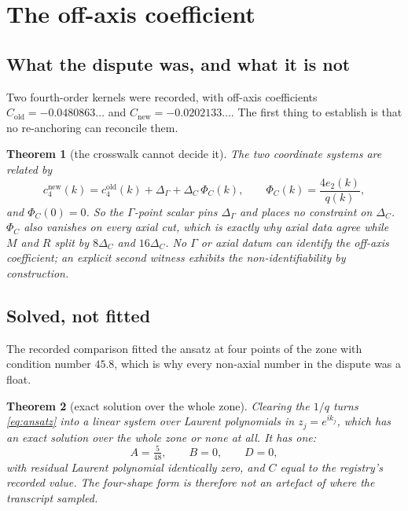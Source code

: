 \documentclass[11pt]{article}
\newtheorem{theorem}{Theorem}[section]
\theoremstyle{definition}
\theoremstyle{remark}
\newcommand{\chk}[1]{}
\begin{document}
\section{The off-axis coefficient}\label{sec:c2}

\subsection{What the dispute was, and what it is not}

Two fourth-order kernels were recorded, with off-axis coefficients
$C_{\mathrm{old}}=-0.0480863\ldots$ and $C_{\mathrm{new}}=-0.0202133\ldots$.
The first thing to establish is that no re-anchoring can reconcile them.

\begin{theorem}[the crosswalk cannot decide it]\label{thm:obstruction}
The two coordinate systems are related by
\[
  c_4^{\mathrm{new}}(k)=c_4^{\mathrm{old}}(k)+\Delta_\Gamma
    +\Delta_C\,\Phi_C(k),\qquad \Phi_C(k)=\frac{4e_2(k)}{q(k)} ,
\]
and $\Phi_C(0)=0$. So the $\Gamma$-point scalar pins $\Delta_\Gamma$ and places
\emph{no} constraint on $\Delta_C$. $\Phi_C$ also vanishes on every axial cut,
which is exactly why axial data agree while $M$ and $R$ split by $8\Delta_C$
and $16\Delta_C$. No $\Gamma$ or axial datum can identify the off-axis
coefficient; an explicit second witness exhibits the non-identifiability by
construction.\chk{FINDING: the retained Gamma/axis data cannot identify C\_shp}
\end{theorem}

\subsection{Solved, not fitted}

The recorded comparison fitted the ansatz at four points of the zone with
condition number $45.8$, which is why every non-axial number in the dispute was
a float.

\begin{theorem}[exact solution over the whole zone]\label{thm:solved}
Clearing the $1/q$ turns \eqref{eq:ansatz} into a linear system over Laurent
polynomials in $z_j=e^{ik_j}$, which has an exact solution over the whole zone
or none at all. It has one:
\[
  A=\tfrac{5}{48},\qquad B=0,\qquad D=0,
\]
with residual Laurent polynomial identically zero, and $C$ equal to the
registry's recorded value. The four-shape form is therefore not an artefact of
where the transcript sampled.\chk{the shape coefficients are solved, not fitted: A = 5/48, B = D = 0 exactly}
\end{theorem}
\end{document}
